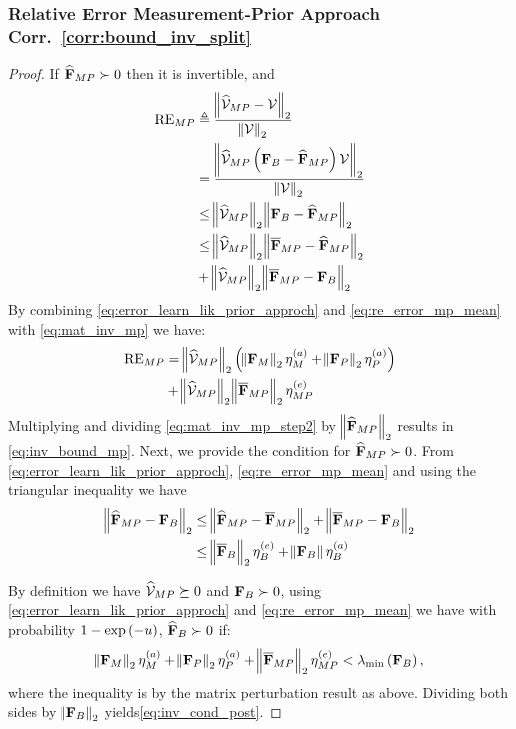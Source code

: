\subsubsection{%
Relative Error Measurement-Prior Approach {Corr.~\ref{corr:bound_inv_split}}}\label{sec:proof_lik_prior_inv}
\begin{proof}
If $\widehat{\mathbf{F}}_{MP} \succ 0$ then it is invertible, %
and
\begin{align}\label{eq:mat_inv_mp}
    \mathrm{RE}_{MP}&\triangleq\frac{\norm{\widehat{\mathcal{V}}_{MP}-\mathcal{V}}_2}{\norm{\mathcal{V}}_2}\nonumber\\
                    &=\frac{\norm{\widehat{\mathcal{V}}_{MP}\left(\mathbf{F}_{B}-\widehat{\mathbf{F}}_{MP}\right)\mathcal{V}}_2}{\norm{\mathcal{V}}_2}\nonumber\\
                    &\leq \norm{\widehat{\mathcal{V}}_{MP}}_2\norm{\mathbf{F}_{B}-\widehat{\mathbf{F}}_{MP}}_2\nonumber\\
                    &\leq  \norm{\widehat{\mathcal{V}}_{MP}}_2\norm{\overline{\mathbf{F}}_{MP}-\widehat{\mathbf{F}}_{MP}}_2\nonumber\\
                    &+\norm{\widehat{\mathcal{V}}_{MP}}_2\norm{\overline{\mathbf{F}}_{MP}-\mathbf{F}_{B}}_2
\end{align}
    By combining \eqref{eq:error_learn_lik_prior_approch} and \eqref{eq:re_error_mp_mean}  with \eqref{eq:mat_inv_mp} we have:
    \begin{align}\label{eq:mat_inv_mp_step2}
        \mathrm{RE}_{MP}&= \norm{\widehat{\mathcal{V}}_{MP}}_2 \left(\norm{\mathbf{F}_{M}}_2\eta_{M}^{(a)}+\norm{\mathbf{F}_{P}}_2\eta_{P}^{(a)}\right)\nonumber\\
                        &+\norm{\widehat{\mathcal{V}}_{MP}}_2\norm{\overline{\mathbf{F}}_{MP}}_2 \eta_{MP}^{(e)}
    \end{align}
    Multiplying and dividing \eqref{eq:mat_inv_mp_step2}  by $\norm{\widehat{\mathbf{F}}_{MP}}_2$  results in \eqref{eq:inv_bound_mp}.
    Next, we provide the 
    condition for
    {$\widehat{\mathbf{F}}_{MP} \succ 0$}. {From \eqref{eq:error_learn_lik_prior_approch}, \eqref{eq:re_error_mp_mean} and using the triangular  inequality we have
    \begin{align}\label{eq:fim_mp_bound_joint}
        \norm{\widehat{\mathbf{F}}_{MP}-\mathbf{F}_{B}}_2&\leq\norm{\widehat{\mathbf{F}}_{MP}-\overline{\mathbf{F}}_{MP}}_2+\norm{\overline{\mathbf{F}}_{MP}-\mathbf{F}_{B}}_2\nonumber\\
                              &\leq \norm{\overline{\mathbf{F}}_{B}}_2\eta_{B}^{(e)}+\norm{\mathbf{F}_{B}}\eta_{B}^{(a)} 
    \end{align}}

    
    By definition we have $\widehat{\mathcal{V}}_{MP}\succeq 0$ and $\mathbf{F}_{B}\succ 0$, using \eqref{eq:error_learn_lik_prior_approch} and \eqref{eq:re_error_mp_mean} we have with probability $1-\exp\left(-u\right)$, $\widehat{\mathbf{F}}_{B} \succ 0$ %
    if:
    \begin{equation*}
       \norm{\mathbf{F}_{M}}_2\eta_{M}^{(a)}+\norm{\mathbf{F}_{P}}_2\eta_{P}^{(a)}+\norm{\overline{\mathbf{F}}_{MP}}_2 \eta_{MP}^{(e)} <\lambda_{\mathrm{min}}\left(\mathbf{F}_{B}\right),
    \end{equation*}
    {where the inequality is by the matrix perturbation result as above. }
    Dividing both sides by $\norm{\mathbf{F}_{B}}_2$ 
    yields\eqref{eq:inv_cond_post}.
    \end{proof}
    

